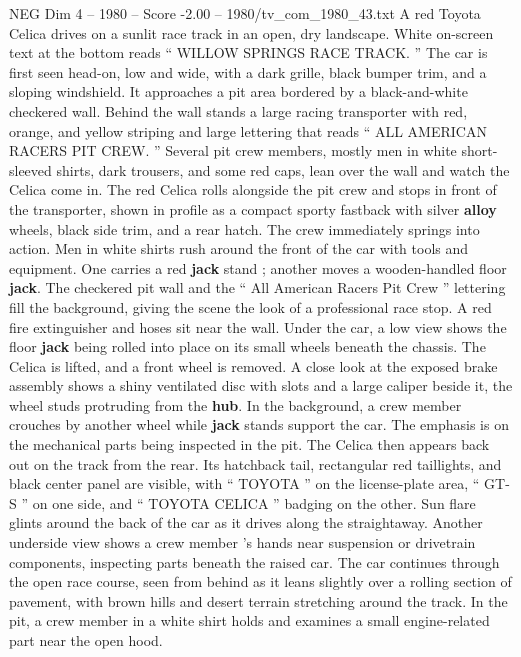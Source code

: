 \begin{textsample}{NEG Dim 4 – 1980 – Score -2.00 – 1980/tv\_com\_1980\_43.txt}  \label{ex:f4_neg_053}
A red Toyota Celica drives on a sunlit race track in an open, dry landscape.
White on-screen text at the bottom reads “ WILLOW SPRINGS RACE TRACK. ” The car is first seen head-on, low and wide, with a dark grille, black bumper trim, and a sloping windshield.
It approaches a pit area bordered by a black-and-white checkered wall.
Behind the wall stands a large racing transporter with red, orange, and yellow striping and large lettering that reads “ ALL AMERICAN RACERS PIT CREW. ” Several pit crew members, mostly men in white short-sleeved shirts, dark trousers, and some red caps, lean over the wall and watch the Celica come in.
The red Celica rolls alongside the pit crew and stops in front of the transporter, shown in profile as a compact sporty fastback with silver \textbf{alloy} wheels, black side trim, and a rear hatch.
The crew immediately springs into action.
Men in white shirts rush around the front of the car with tools and equipment.
One carries a red \textbf{jack} stand ; another moves a wooden-handled floor \textbf{jack}.
The checkered pit wall and the “ All American Racers Pit Crew ” lettering fill the background, giving the scene the look of a professional race stop.
A red fire extinguisher and hoses sit near the wall.
Under the car, a low view shows the floor \textbf{jack} being rolled into place on its small wheels beneath the chassis.
The Celica is lifted, and a front wheel is removed.
A close look at the exposed brake assembly shows a shiny ventilated disc with slots and a large caliper beside it, the wheel studs protruding from the \textbf{hub}.
In the background, a crew member crouches by another wheel while \textbf{jack} stands support the car.
The emphasis is on the mechanical parts being inspected in the pit.
The Celica then appears back out on the track from the rear.
Its hatchback tail, rectangular red taillights, and black center panel are visible, with “ TOYOTA ” on the license-plate area, “ GT-S ” on one side, and “ TOYOTA CELICA ” badging on the other.
Sun flare glints around the back of the car as it drives along the straightaway.
Another underside view shows a crew member ’s hands near suspension or drivetrain components, inspecting parts beneath the raised car.
The car continues through the open race course, seen from behind as it leans slightly over a rolling section of pavement, with brown hills and desert terrain stretching around the track.
In the pit, a crew member in a white shirt holds and examines a small engine-related part near the open hood.

\end{textsample}
